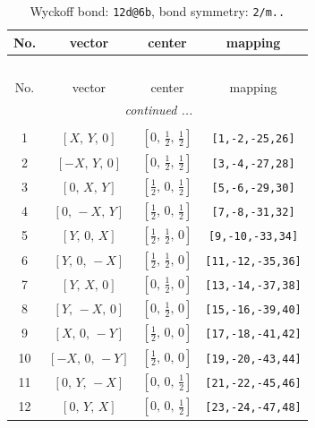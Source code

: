 \documentclass[fleqn,8pt]{jsarticle}
\begin{document}
\begin{longtable}{cccc}
\caption{Wyckoff bond: {\tt 12d@6b}, bond symmetry: {\tt 2/m..}}
 \\
 \hline \hline
No. & vector & center & mapping \\ \hline \endfirsthead

\multicolumn{3}{l}{\tablename\ \thetable{}} \\
 \hline \hline
No. & vector & center & mapping \\ \hline \endhead

 \hline \hline
\multicolumn{3}{r}{\footnotesize\it continued ...} \\ \endfoot

 \hline \hline
\multicolumn{3}{r}{} \\ \endlastfoot

1 & $\left[ X,\, Y,\, 0 \right]$ & $\left[ 0,\, \frac{1}{2},\, \frac{1}{2} \right]$ & {\tt [1,-2,-25,26]} \\ \hline
2 & $\left[ - X,\, Y,\, 0 \right]$ & $\left[ 0,\, \frac{1}{2},\, \frac{1}{2} \right]$ & {\tt [3,-4,-27,28]} \\ \hline
3 & $\left[ 0,\, X,\, Y \right]$ & $\left[ \frac{1}{2},\, 0,\, \frac{1}{2} \right]$ & {\tt [5,-6,-29,30]} \\ \hline
4 & $\left[ 0,\, - X,\, Y \right]$ & $\left[ \frac{1}{2},\, 0,\, \frac{1}{2} \right]$ & {\tt [7,-8,-31,32]} \\ \hline
5 & $\left[ Y,\, 0,\, X \right]$ & $\left[ \frac{1}{2},\, \frac{1}{2},\, 0 \right]$ & {\tt [9,-10,-33,34]} \\ \hline
6 & $\left[ Y,\, 0,\, - X \right]$ & $\left[ \frac{1}{2},\, \frac{1}{2},\, 0 \right]$ & {\tt [11,-12,-35,36]} \\ \hline
7 & $\left[ Y,\, X,\, 0 \right]$ & $\left[ 0,\, \frac{1}{2},\, 0 \right]$ & {\tt [13,-14,-37,38]} \\ \hline
8 & $\left[ Y,\, - X,\, 0 \right]$ & $\left[ 0,\, \frac{1}{2},\, 0 \right]$ & {\tt [15,-16,-39,40]} \\ \hline
9 & $\left[ X,\, 0,\, - Y \right]$ & $\left[ \frac{1}{2},\, 0,\, 0 \right]$ & {\tt [17,-18,-41,42]} \\ \hline
10 & $\left[ - X,\, 0,\, - Y \right]$ & $\left[ \frac{1}{2},\, 0,\, 0 \right]$ & {\tt [19,-20,-43,44]} \\ \hline
11 & $\left[ 0,\, Y,\, - X \right]$ & $\left[ 0,\, 0,\, \frac{1}{2} \right]$ & {\tt [21,-22,-45,46]} \\ \hline
12 & $\left[ 0,\, Y,\, X \right]$ & $\left[ 0,\, 0,\, \frac{1}{2} \right]$ & {\tt [23,-24,-47,48]} \\
\end{longtable}
\end{document}
